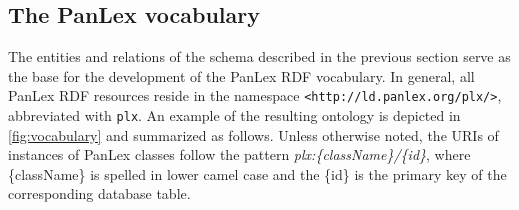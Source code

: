 \documentclass[sw]{iosart2c}
\begin{document}
\subsection{The PanLex vocabulary}
\label{sec:vocabulary}
The entities and relations of the schema described in the previous section serve as the base for the development of the PanLex RDF vocabulary.
In general, all PanLex RDF resources reside in the namespace \texttt{\small <http://ld.panlex.org/plx/>}, abbreviated with \texttt{\small plx}.
An example of the resulting ontology is depicted in \autoref{fig:vocabulary} and summarized as follows.
Unless otherwise noted, the URIs of instances of PanLex classes follow the pattern \emph{plx:\{className\}/\{id\}}, where \{className\} is spelled in lower camel case and the \{id\} is the primary key of the corresponding database table.
\end{document}

